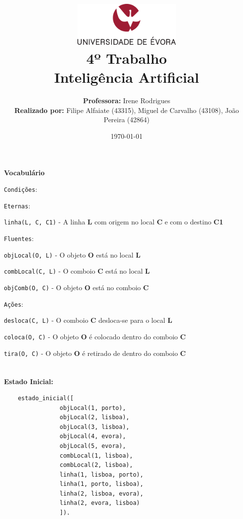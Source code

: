 \documentclass[11pt]{article}
\title
{
    \includegraphics[width=0.4\textwidth]{imgs/university.png}
    \\[0.1cm]
    \textbf{4º Trabalho} \\
    Inteligência Artificial
}
\author
{
    \textbf{Professora:} Irene Rodrigues \\
    \textbf{Realizado por:} Filipe Alfaiate (43315), Miguel de Carvalho (43108), João Pereira (42864) 
}
\date{\today}
\begin{document}
\maketitle

\section{}

\textbf{Vocabulário}

\hspace{0,4cm}\verb|Condições|:

\hspace{0,8cm}\verb|Eternas|:

\hspace{1,2cm} \verb|linha(L, C, C1)| - A linha \textbf{L} com origem no local \textbf{C} e 
com o destino \textbf{C1}

\hspace{0,8cm} \verb|Fluentes|:

\hspace{1,2cm} \verb|objLocal(O, L)| - O objeto \textbf{O} está no local \textbf{L} 

\hspace{1,2cm} \verb|combLocal(C, L)| - O comboio \textbf{C} está no local \textbf{L} 

\hspace{1,2cm} \verb|objComb(O, C)| - O objeto \textbf{O} está no comboio \textbf{C}


\hspace{0,4cm}\verb|Ações|:

\hspace{0,8cm} \verb|desloca(C, L)| - O comboio \textbf{C} desloca-se para o local \textbf{L}

\hspace{0,8cm} \verb|coloca(O, C)| - O objeto \textbf{O} é colocado dentro do comboio \textbf{C}

\hspace{0,8cm} \verb|tira(O, C)| - O objeto \textbf{O} é retirado de dentro do comboio \textbf{C}


\section{}

\textbf{Estado Inicial:}

\begin{lstlisting}
    estado_inicial([
                objLocal(1, porto),
                objLocal(2, lisboa),
                objLocal(3, lisboa),
                objLocal(4, evora),
                objLocal(5, evora),
                combLocal(1, lisboa),
                combLocal(2, lisboa),
                linha(1, lisboa, porto),
                linha(1, porto, lisboa),
                linha(2, lisboa, evora),
                linha(2, evora, lisboa)
                ]).
\end{lstlisting}
\end{document}
